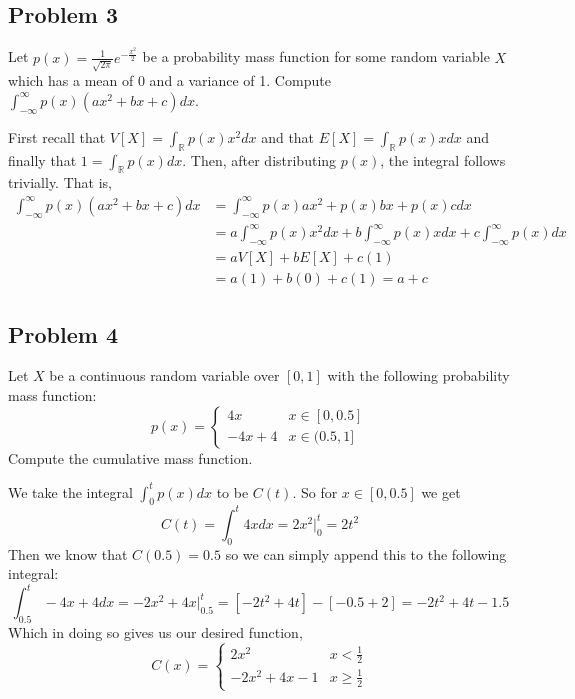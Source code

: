 \documentclass{article}
\theoremstyle{definition}
\begin{document}
    \subsection*{Problem 3}
        \begin{mdframed}[]
            Let $p(x) = \frac{1}{\sqrt{2\pi}}e^{-\frac{x^2}{2}}$ be a probability mass function for some random variable $X$ which has a mean of 0 and a variance of 1.
            Compute $\int_{-\infty}^\infty p(x)(ax^2 + bx + c)dx$.
        \end{mdframed}
        First recall that $V[X] = \int_{\mathbb{R}}p(x)x^2dx$ and that $E[X] = \int_{\mathbb{R}}p(x)xdx$ and finally that $1 = \int_{\mathbb{R}}p(x)dx$.
        Then, after distributing $p(x)$, the integral follows trivially. That is,
        \begin{align*}
            \int_{-\infty}^\infty p(x)(ax^2 + bx + c)dx &= \int_{-\infty}^\infty p(x) ax^2 + p(x) bx + p(x) c dx \\
            &= a\int_{-\infty}^\infty p(x)x^2dx + b\int_{-\infty}^\infty p(x)xdx + c \int_{-\infty}^\infty p(x) dx \\
            &= a V[X] + bE[X] + c(1) \\
            &= a(1) + b(0) + c(1) = a + c
        \end{align*}
    \subsection*{Problem 4}
        \begin{mdframed}[]
            Let $X$ be a continuous random variable over $[0,1]$ with the following probability mass function:
            \[
                p(x) = \begin{cases}
                    4x & x \in [0,0.5]\\
                    -4x + 4 & x \in (0.5,1]
                \end{cases}
            \]
            Compute the cumulative mass function.
        \end{mdframed}
        We take the integral $\int_0^t p(x)dx$ to be $C(t)$. So for $x \in [0,0.5]$ we get 
        \[
            C(t) = \int_0^t 4xdx = 2x^2\bigg|_0^t = 2t^2
        \]
        Then we know that $C(0.5) = 0.5$ so we can simply append this to the following integral:
        \[
            \int_{0.5}^t -4x+4dx = -2x^2 + 4x \bigg|_0.5^t = [-2t^2 + 4t] - [-0.5 + 2] = -2t^2 + 4t - 1.5
        \]
        Which in doing so gives us our desired function,
        \[
            C(x) = \begin{cases}
                2x^2 & x < \frac{1}{2}\\
                -2x^2 + 4x - 1 & x \geqslant \frac{1}{2}
            \end{cases}
        \]
\end{document}
